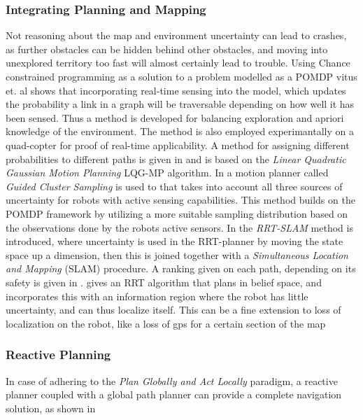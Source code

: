 \subsubsection{Integrating Planning and Mapping}
Not reasoning about the map and environment uncertainty can lead to crashes, as
further obstacles can be hidden behind other obstacles, and moving into
unexplored territory too fast will almost certainly lead to trouble. Using
Chance constrained programming as a solution to a problem modelled as a POMDP
vitus et. al \cite{vitusHierarchicalMethodStochastic2012} shows that
incorporating real-time sensing into the model, which updates the probability a
link in a graph will be traversable depending on how well it has been sensed.
Thus a method is developed for balancing exploration and apriori knowledge of
the environment. The method is also employed experimantally on a quad-copter for
proof of real-time applicability. A method for assigning different probabilities
to different paths is given in \cite{vandenbergLQGMPOptimizedPath2011} and is
based on the \textit{Linear Quadratic Gaussian Motion Planning} LQG-MP
algorithm. In \cite{kurniawatiGlobalMotionPlanning2012} a motion planner called
\textit{Guided Cluster Sampling} is used to that takes into account all three
sources of uncertainty for robots with active sensing capabilities. This method
builds on the POMDP framework by utilizing a more suitable sampling distribution
based on the observations done by the robots active sensors. In
\cite{yifenghuangRRTSLAMMotionPlanning2008} the \textit{RRT-SLAM} method is
introduced, where uncertainty is used in the RRT-planner by moving the state
space up a dimension, then this is joined together with a \textit{Simultaneous
  Location and Mapping} (SLAM) procedure. A ranking given on each path,
depending on its safety is given in
\cite{blakeEfficientComputationCollision2018}.
\cite{bryRapidlyexploringRandomBelief2011} gives an RRT algorithm that plans in
belief space, and incorporates this with an information region where the robot
has little uncertainty, and can thus localize itself. This can be a fine
extension to loss of localization on the robot, like a loss of gps for a certain
section of the map

\subsubsection{Reactive Planning} In case of adhering to the \textit{Plan
  Globally and Act Locally} paradigm, a reactive planner coupled with a global
path planner can provide a complete navigation solution, as shown in
\cite{djekouneSensorBasedNavigation2009}

